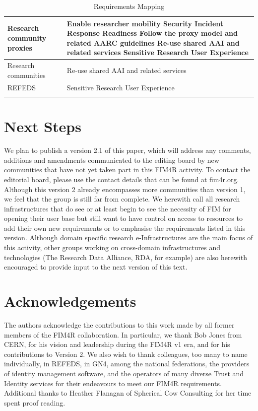 \documentclass[fleqn,10pt]{wlscirep}
\begin{document}
{\begin{center}
\begin{longtable}{|p{}|p{}|}
Research community proxies & 
Enable researcher mobility\newline
Security Incident Response Readiness\newline
Follow the proxy model and related AARC guidelines\newline
Re-use shared AAI and related services\newline
Sensitive Research User Experience \\ \hline 

Research communities & 
Re-use shared AAI and related services\\ \hline

REFEDS & 
Sensitive Research User Experience \\ \hline

\caption{Requirements Mapping}
\label{tab:mapping}
\end{longtable}
\end{center}

\section{Next Steps}
We plan to publish a version 2.1 of this paper, which will address any comments, additions and amendments communicated to the editing board by new communities that have not yet taken part in this FIM4R activity. To contact the editorial board, please use the contact details that can be found at fim4r.org. Although this version 2 already encompasses more communities than version 1, we feel that the group is still far from complete. We herewith call all research infrastructures that do see or at least begin to see the necessity of FIM for opening their user base but still want to have control on access to resources to add their own new requirements or to emphasise the requirements listed in this version. Although domain specific research e-Infrastructures are the main focus of this activity, other groups working on cross-domain infrastructures and technologies (The Research Data Alliance, RDA, for example) are also herewith encouraged to provide input to the next version of this text. 


\begin{flushleft}

\end{flushleft}

\section{Acknowledgements}
The authors acknowledge the contributions to this work made by all former members of the FIM4R collaboration. In particular, we thank Bob Jones from CERN, for his vision and leadership during the FIM4R v1 era, and for his contributions to Version 2. We also wish to thank colleagues, too many to name individually, in REFEDS, in GN4, among the national federations, the providers of identity management software, and the operators of many diverse Trust and Identity services for their endeavours to meet our FIM4R requirements. Additional thanks to Heather Flanagan of Spherical Cow Consulting for her time spent proof reading.

}
\end{document}

